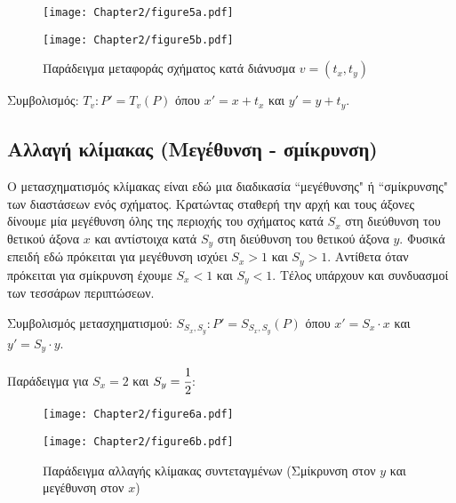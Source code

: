 \begin{figure}[h!]
\begin{center}
\begin{minipage}[b]{0.48\textwidth} %
    \texttt{[image: Chapter2/figure5a.pdf]}
\end{minipage}%
\hfill
\begin{minipage}[b]{0.48\textwidth} %
    \texttt{[image: Chapter2/figure5b.pdf]}
\end{minipage}

\end{center}
  \caption{Παράδειγμα μεταφοράς σχήματος κατά διάνυσμα $v = (t_x, t_y)$}
\end{figure}

Συμβολισμός: $T_v : P' = T_v(P)$ όπου $x' = x + t_x$ και $y' = y + t_y$.

\subsection{Αλλαγή κλίμακας (Μεγέθυνση - σμίκρυνση)}

Ο μετασχηματισμός κλίμακας είναι εδώ μια διαδικασία ``μεγέθυνσης" ή ``σμίκρυνσης" των διαστάσεων ενός σχήματος. Κρατώντας σταθερή την αρχή και τους άξονες δίνουμε μία μεγέθυνση όλης της περιοχής του σχήματος κατά $S_x$ στη διεύθυνση του θετικού άξονα $x$ και αντίστοιχα κατά $S_y$ στη διεύθυνση του θετικού άξονα $y$. Φυσικά επειδή εδώ πρόκειται για μεγέθυνση ισχύει $S_x > 1$ και $S_y > 1$. Αντίθετα όταν πρόκειται για σμίκρυνση έχουμε $S_x < 1$ και $S_y < 1$. Τέλος υπάρχουν και συνδυασμοί των τεσσάρων περιπτώσεων.

Συμβολισμός μετασχηματισμού: $S_{S_x, S_y} : P' = S_{S_x, S_y}(P)$ όπου $x' = S_x \cdot x$ και $y' = S_y \cdot y$.


Παράδειγμα για $S_x = 2$ και $S_y = \cfrac{1}{2}$:

\begin{figure}[h!]
	\begin{center}
		\begin{minipage}[b]{0.48\textwidth}
		    \texttt{[image: Chapter2/figure6a.pdf]}
		\end{minipage}
		\hfill
		\begin{minipage}[b]{0.48\textwidth} 
		    \texttt{[image: Chapter2/figure6b.pdf]}
		\end{minipage}
	\end{center}
	\caption{Παράδειγμα αλλαγής κλίμακας συντεταγμένων (Σμίκρυνση στον $y$ και μεγέθυνση στον $x$)}
\end{figure}

